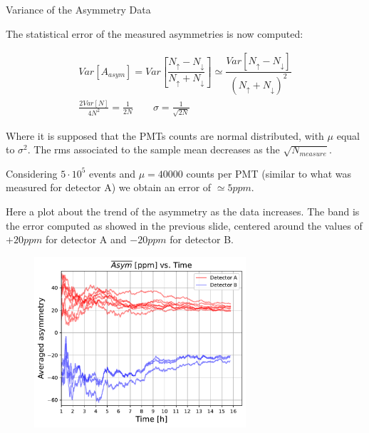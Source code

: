 \documentclass[9pt,a4paper]{beamer}
\begin{document}
\begin{frame}{Variance of the Asymmetry Data}

The statistical error of the measured asymmetries is now computed:

\begin{gather*}
Var[A_{asym}] = Var[\dfrac{N_{\uparrow} - N_{\downarrow}}{ N_{\uparrow} + N_{\downarrow}}] \simeq \dfrac{Var[N_{\uparrow} - N_{\downarrow}]}{(N_{\uparrow} + N_{\downarrow})^{2}} \\
\frac{2Var[N]}{4N^{2}} = \frac{1}{2N} \qquad \sigma = \frac{1}{\sqrt{2N}}
\end{gather*}

Where it is supposed that the PMTs counts are normal distributed, with $\mu$ equal to $\sigma^{2}$. The rms associated to the sample mean decreases as the $\sqrt{N_{measure}}$. 

Considering $5\cdot 10^{5}$ events and $\mu = 40000$ counts per PMT (similar to what was measured for detector A) we obtain an error of $\simeq 5ppm$.

\end{frame}


\begin{frame}

Here a plot about the trend of the asymmetry as the data increases. The band is the error computed as showed in the previous slide, centered around the values of $+20ppm$ for detector A and $-20ppm$ for detector B.

\begin{figure}[hbtp]
\centering
\includegraphics[width = 0.70\textwidth]{figures/AveragedAsymmetry.pdf}
\end{figure}

\end{frame}
\end{document}

